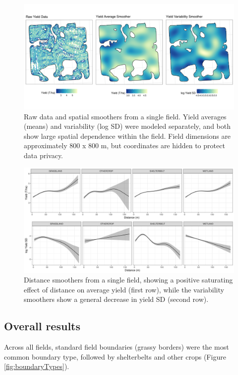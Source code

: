 \documentclass[]{elsarticle} %
\begin{document}
\begin{figure}
\includegraphics[width=1\linewidth]{../Figures/ExamplePlots/spatialSmooths} \caption{Raw data and spatial smoothers from a single field. Yield averages (means) and variability (log SD) were modeled separately, and both show large spatial dependence within the field. Field dimensions are approximately 800 x 800 m, but coordinates are hidden to protect data privacy.}\label{fig:spatialSmooths}
\end{figure}

\begin{figure}
\includegraphics[width=1\linewidth]{../Figures/ExamplePlots/distSmooths} \caption{Distance smoothers from a single field, showing a positive saturating effect of distance on average yield (first row), while the variability smoothers show a general decrease in yield SD (second row).}\label{fig:distSmooths}
\end{figure}

\hypertarget{overall-results}{%
\subsection{Overall results}\label{overall-results}}

Across all fields, standard field boundaries (grassy borders) were the most common boundary type, followed by shelterbelts and other crops (Figure \ref{fig:boundaryTypes}).
\end{document}
